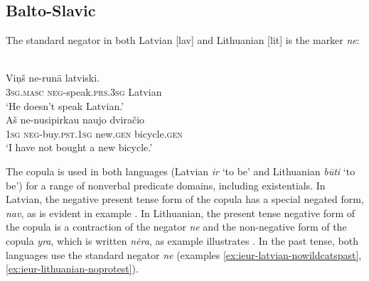 ﻿\documentclass[output=paper]{langsci/langscibook}
\begin{document}
\subsection{Balto-Slavic}\label{sec:ieur-4.3}

The standard negator in both Latvian [lav] and Lithuanian [lit] is the marker \textit{ne}:
%
\begin{exe}
\ex\label{ex:ieur-latvian-speak}
\\
    \gll Viņš ne-runā latviski. \\
\textsc{3sg.masc} \textsc{neg}-speak.\textsc{prs.3sg} Latvian \\
    \glt `He doesn't speak Latvian.' 
\ex\label{ex:ieur-lithuanian-bicycle}
\\
    \gll Aš ne-nusipirkau naujo dviračio \\
\textsc{1sg} \textsc{neg}-buy.\textsc{pst.1sg}  new.\textsc{gen} bicycle.\textsc{gen} \\
    \glt `I have not bought a new bicycle.' 
    \end{exe}
%
The copula is used in both languages (Latvian \textit{ir} `to be' and
Lithuanian \textit{būti} `to be') for a range of nonverbal predicate
domains, including existentials. In Latvian, the negative
present tense form of the copula has a special negated form, \textit{nav},
as is evident in example . In
Lithuanian, the present tense negative form of the copula is
a contraction of the negator \textit{ne} and the non-negative form of the
copula \textit{yra}, which is written \textit{nėra}, as example
 illustrates
\citep[1976]{Mathiassen1996}. In the past tense, both languages use the
standard negator \textit{ne} (examples
\ref{ex:ieur-latvian-nowildcatspast}, \ref{ex:ieur-lithuanian-noprotest}). 
\end{document}
